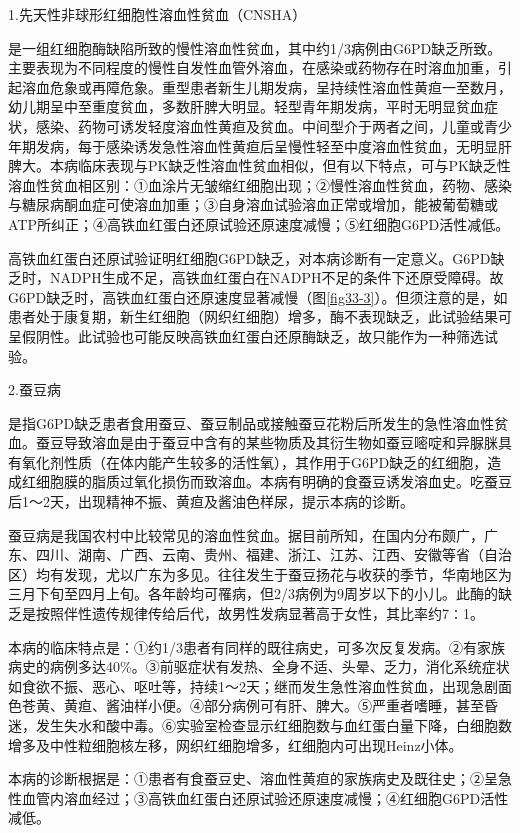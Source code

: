 1.先天性非球形红细胞性溶血性贫血（CNSHA）%

是一组红细胞酶缺陷所致的慢性溶血性贫血，其中约1/3病例由G6PD缺乏所致。主要表现为不同程度的慢性自发性血管外溶血，在感染或药物存在时溶血加重，引起溶血危象或再障危象。重型患者新生儿期发病，呈持续性溶血性黄疸一至数月，幼儿期呈中至重度贫血，多数肝脾大明显。轻型青年期发病，平时无明显贫血症状，感染、药物可诱发轻度溶血性黄疸及贫血。中间型介于两者之间，儿童或青少年期发病，每于感染诱发急性溶血性黄疸后呈慢性轻至中度溶血性贫血，无明显肝脾大。本病临床表现与PK缺乏性溶血性贫血相似，但有以下特点，可与PK缺乏性溶血性贫血相区别：①血涂片无皱缩红细胞出现；②慢性溶血性贫血，药物、感染与糖尿病酮血症可使溶血加重；③自身溶血试验溶血正常或增加，能被葡萄糖或ATP所纠正；④高铁血红蛋白还原试验还原速度减慢；⑤红细胞G6PD活性减低。

高铁血红蛋白还原试验证明红细胞G6PD缺乏，对本病诊断有一定意义。G6PD缺乏时，NADPH生成不足，高铁血红蛋白在NADPH不足的条件下还原受障碍。故G6PD缺乏时，高铁血红蛋白还原速度显著减慢（图\ref{fig33-3}）。但须注意的是，如患者处于康复期，新生红细胞（网织红细胞）增多，酶不表现缺乏，此试验结果可呈假阴性。此试验也可能反映高铁血红蛋白还原酶缺乏，故只能作为一种筛选试验。

2.蚕豆病%

是指G6PD缺乏患者食用蚕豆、蚕豆制品或接触蚕豆花粉后所发生的急性溶血性贫血。蚕豆导致溶血是由于蚕豆中含有的某些物质及其衍生物如蚕豆嘧啶和异脲脒具有氧化剂性质（在体内能产生较多的活性氧），其作用于G6PD缺乏的红细胞，造成红细胞膜的脂质过氧化损伤而致溶血。本病有明确的食蚕豆诱发溶血史。吃蚕豆后1～2天，出现精神不振、黄疸及酱油色样尿，提示本病的诊断。

蚕豆病是我国农村中比较常见的溶血性贫血。据目前所知，在国内分布颇广，广东、四川、湖南、广西、云南、贵州、福建、浙江、江苏、江西、安徽等省（自治区）均有发现，尤以广东为多见。往往发生于蚕豆扬花与收获的季节，华南地区为三月下旬至四月上旬。各年龄均可罹病，但2/3病例为9周岁以下的小儿。此酶的缺乏是按照伴性遗传规律传给后代，故男性发病显著高于女性，其比率约7∶1。

本病的临床特点是：①约1/3患者有同样的既往病史，可多次反复发病。②有家族病史的病例多达40\%。③前驱症状有发热、全身不适、头晕、乏力，消化系统症状如食欲不振、恶心、呕吐等，持续1～2天；继而发生急性溶血性贫血，出现急剧面色苍黄、黄疸、酱油样小便。④部分病例可有肝、脾大。⑤严重者嗜睡，甚至昏迷，发生失水和酸中毒。⑥实验室检查显示红细胞数与血红蛋白量下降，白细胞数增多及中性粒细胞核左移，网织红细胞增多，红细胞内可出现Heinz小体。

本病的诊断根据是：①患者有食蚕豆史、溶血性黄疸的家族病史及既往史；②呈急性血管内溶血经过；③高铁血红蛋白还原试验还原速度减慢；④红细胞G6PD活性减低。

